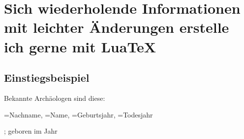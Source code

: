 
\chapter[Infos]{Sich wiederholende Informationen mit leichter Änderungen erstelle ich gerne mit LuaTeX}
\section{Einstiegsbeispiel}


Bekannte Archäologen sind diese:






\begin{itemize}
{\nachname=Nachname,%
	\name=Name,%
	\geburtsjahr=Geburtsjahr,%
	\todesjahr=Todesjahr%
}%
{\item[\theDTLrowi .] \name\xspace \nachname;%
geboren im Jahr \geburtsjahr\ifdefempty{}%
}
\end{itemize}


